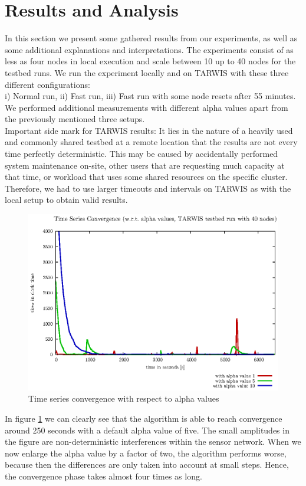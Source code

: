 \documentclass{llncs}
\begin{document}
\section{Results and Analysis}
In this section we present some gathered results from our experiments, as well as some additional explanations and interpretations. The experiments consist of as less as four nodes in local execution and scale between 10 up to 40 nodes for the testbed runs. We run the experiment locally and on TARWIS with these three different configurations:\\ i) Normal run, ii) Fast run, iii) Fast run with some node resets after 55 minutes.\\
We performed additional measurements with different alpha values apart from the previously mentioned three setups.\\
\indent Important side mark for TARWIS results: It lies in the nature of a heavily used and commonly shared testbed at a remote location that the results are not every time perfectly deterministic. This may be caused by accidentally performed system maintenance on-site, other users that are requesting much capacity at that time, or workload that uses some shared resources on the specific cluster. Therefore, we had to use larger timeouts and intervals on TARWIS as with the local setup to obtain valid results.
\begin{figure}[H]
\centering
\includegraphics[scale=0.6]{images/FIG_01.eps}
\caption{Time series convergence with respect to alpha values}
\label{fig:alpha}
\end{figure}
\noindent In figure \ref{fig:alpha} we can clearly see that the algorithm is able to reach convergence around 250 seconds with a default alpha value of five. The small amplitudes in the figure are non-deterministic interferences within the sensor network. When we now enlarge the alpha value by a factor of two, the algorithm performs worse, because then the differences are only taken into account at small steps. Hence, the convergence phase takes almost four times as long.\\
\end{document}
